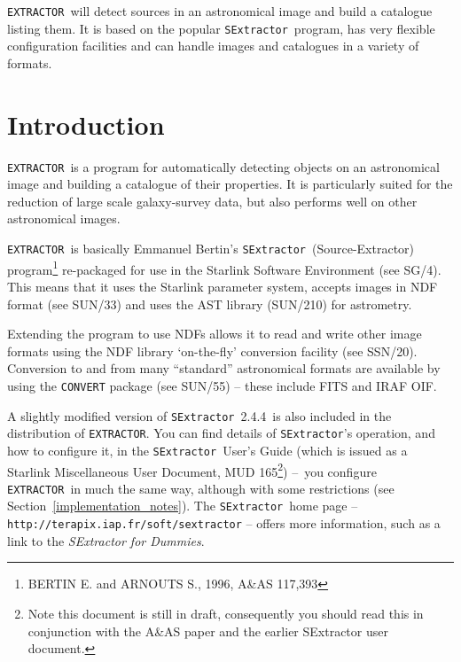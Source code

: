 \documentclass[twoside,11pt]{article}
\newcommand{\stardocinitials}  {SUN}
\newcommand{\stardocnumber}    {226.11}
\newcommand{\stardocabstract}  {\EXTRACTOR\ will detect sources in
an astronomical image and build a catalogue listing them. It is based on the
popular \SExtractor\ program, has very flexible configuration
facilities and can handle images and catalogues in a variety of formats.}
\newcommand{\sexversion}{2.4.4}
\newcommand{\stardocname}{\stardocinitials /\stardocnumber}
\newcommand{\htmladdnormallink}[2]{#1}
\newcommand{\htmlref}[2]{#1}
\newenvironment{latexonly}{}{}
\newcommand{\latex}[1]{#1}
\newcommand{\xref}[3]{#1}
\newcommand{\xlabel}[1]{}
\renewcommand{\_}{\texttt{\symbol{95}}}
\newcommand{\EXTRACTOR}{\texttt{EXTRACTOR}}
\newcommand{\CONVERT}{\texttt{CONVERT}}
\newcommand{\SExtractor}{\texttt{SExtractor}}
\newcommand{\SExtractorURL}{http://terapix.iap.fr/soft/sextractor}
\newcommand{\DUMMIESURL}{http://www-int.stsci.edu/~holwerda/se.html}
\newcommand{\IRAFURL}{http://www.starlink.rl.ac.uk/iraf/web/iraf-homepage.html}
\newcommand{\FITSURL}{http://fits.gsfc.nasa.gov/}
\newcommand{\MUD}{mud165.ps}
\newcommand{\dash}{--}
\newcommand{\dash}{-}
\renewcommand{\thepage}{\roman{page}}
\begin{document}
\stardocabstract
  \newpage
  \begin{latexonly}
    \setlength{\parskip}{0mm}
    \tableofcontents
    \setlength{\parskip}{\medskipamount}
    \markboth{\stardocname}{\stardocname}
  \end{latexonly}
\cleardoublepage
\renewcommand{\thepage}{\arabic{page}}
\setcounter{page}{1}

\section{\xlabel{introduction}Introduction}
\EXTRACTOR\ is a program for automatically detecting objects on an
astronomical image and building a catalogue of their properties. It is
particularly suited for the reduction of large scale galaxy-survey
data, but also performs well on other astronomical images.

\EXTRACTOR\ is basically Emmanuel Bertin's \SExtractor\
(Source-Extractor) program\footnote{BERTIN E. and ARNOUTS S., 1996,
A\&AS 117,393} re-packaged for use in the
\xref{Starlink Software Environment}{sg4}{} \latex{(see SG/4)}.
This means that it uses the Starlink parameter system, accepts images in
\xref{NDF}{sun33}{abstract} format \latex{(see SUN/33)} and uses the
\xref{AST}{sun210}{} library \latex{(SUN/210)} for astrometry.

Extending the program to use NDFs allows it to read and write other
image formats using the NDF library \xref{`on-the-fly' conversion
facility}{ssn20}{abstract} \latex{(see SSN/20)}.  Conversion to and
from many ``standard'' astronomical
\xref{formats}{sun55}{the_default_conversion_commands} are available
by using the \xref{\CONVERT}{sun55}{abstract} package \latex{(see
SUN/55)} -- these include \htmladdnormallink{FITS}{\FITSURL} and
\htmladdnormallink{IRAF}{\IRAFURL} OIF.

A slightly modified version of \SExtractor\ \sexversion\ is also
included in the distribution of \EXTRACTOR.
You can find details of \SExtractor's operation, and how to configure
it, in the \htmladdnormallink{\SExtractor\ User's Guide}{\MUD} (which is
issued as a Starlink Miscellaneous User Document, MUD 165\footnote{Note this
document is still in draft, consequently you should read this in
conjunction with the \htmladdnormallink{A\&AS paper}{sexpaper.ps}
and the \htmladdnormallink{earlier SExtractor user document}{sex1_doc.ps}.})
\dash\ you configure \EXTRACTOR\
in much the same way, although with
\htmlref{some restrictions}{implementation_notes}
\latex{(see Section~\ref{implementation_notes})}. The \SExtractor\ home page
-- \htmladdnormallink{\texttt{\SExtractorURL}}{\SExtractorURL} -- 
offers more information, such as a link to the 
\htmladdnormallink{\textit{SExtractor for Dummies}}{\DUMMIESURL}.
\end{document}
